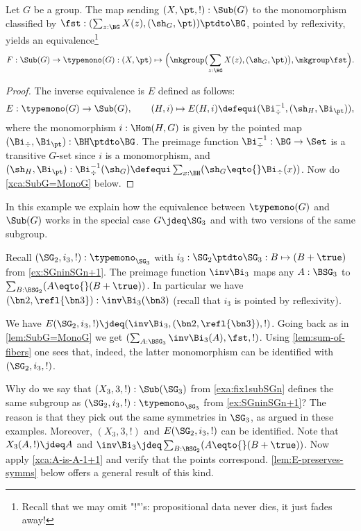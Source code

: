 \begin{lemma}\label{lem:SubG=MonoG}
  Let $G$ be a group.
  The map sending $(X,\pt,!) : \Sub(G)$ to the monomorphism classified by  
  $\fst: (\sum_{z:\BG}X(z),(\sh_G,\pt))\ptdto\BG$, pointed by
  reflexivity, yields an equivalence\footnote{%
  Recall that we may omit "!"'s: propositional data never dies, 
  it just fades away!}
\[
F: \Sub(G)\to \typemono(G) : (X,\pt) \mapsto \Bigl(\mkgroup \bigl(\sum_{z:\BG}X(z),(\sh_G,\pt)\bigr),\mkgroup\fst\Bigr).\qedhere
\]
\end{lemma}

\begin{proof}
   The inverse equivalence is $E$ defined as follows:
 $$E:\typemono(G)\to\Sub(G),\qquad 
   (H,i)\mapsto E(H,i)\defequi (\Bi_\div^{-1},(\sh_H,\Bi_\pt)),$$
  where the monomorphism $i:\Hom(H,G)$ is given by 
  the pointed map $(\Bi_\div,\Bi_\pt):\BH\ptdto\BG$.
  The preimage function $\Bi_\div^{-1}:\BG\to\Set$ is a transitive $G$-set 
  since $i$ is a monomorphism, and $(\sh_H,\Bi_\pt):\Bi_\div^{-1}(\sh_G)
  \defequi \sum_{x:\BH}(\sh_G\eqto{}\Bi_\div(x))$.
  Now do \cref{xca:SubG=MonoG} below.
\end{proof}

 \begin{example}\label{exa:EforSG3}
  In this example we explain how the equivalence between
  $\typemono(G)$ and $\Sub(G)$ works in the special case
  $G\jdeq\SG_3$ and with two versions of the same subgroup.
  
  Recall $(\SG_2,i_3,!):\typemono_{\SG_3}$ with
  $i_3: \SG_2\ptdto\SG_3 : B\mapsto (B+\true)$ from \cref{ex:SGninSGn+1}.
  The preimage function $\inv\Bi_3$ maps any $A:\BSG_3$
  to $\sum_{B:\BSG_2}(A\eqto{}(B+\true))$.
  In particular we have $(\bn2,\refl{\bn3}):\inv\Bi_3(\bn3)$
  (recall that $i_3$ is pointed by reflexivity).
   
  We have $E(\SG_2,i_3,!)\jdeq(\inv\Bi_3,(\bn2,\refl{\bn3}),!)$.
  Going back as in \cref{lem:SubG=MonoG} we get 
  $(\sum_{A:\BSG_3}\inv\Bi_3(A),\fst,!)$. Using \cref{lem:sum-of-fibers}
  one sees that, indeed, the latter monomorphism 
  can be identified with $(\SG_2,i_3,!)$.
  
  Why do we say that $(X_3,3,!):\Sub(\SG_3)$ from \cref{exa:fix1subSGn}
  defines the same subgroup as $(\SG_2,i_3,!):\typemono_{\SG_3}$
  from \cref{ex:SGninSGn+1}? The reason is that they pick out
  the same symmetries in $\SG_3$, as argued in these examples.
  Moreover, $(X_3,3,!)$ and $E(\SG_2,i_3,!)$ can be identified.
  Note that $X_3(A,!) \jdeq A$ and 
  $\inv\Bi_3 \jdeq \sum_{B:\BSG_2}(A\eqto{}(B+\true))$.
  Now apply \cref{xca:A-is-A-1+1} and verify that the points correspond.
  \cref{lem:E-preserves-symms} below offers a general result of this kind.
  \end{example}

